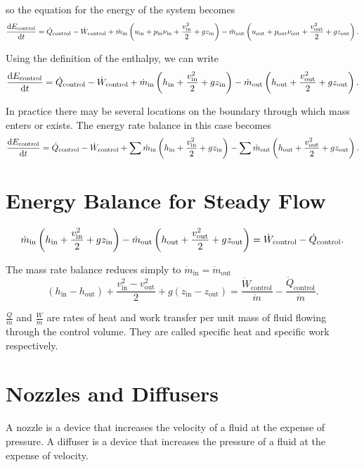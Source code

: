 \documentclass{report}
\begin{document}
so the equation for the energy of the system becomes
\[
	\dv{E_\text{control}}{t} = \dot{Q}_\text{control} - \dot{W}_\text{control} + \dot{m}_\text{in}\lt(u_\text{in} + p_\text{in}\nu_\text{in} + \frac{v_\text{in}^2}{2} + gz_\text{in}\rt) - \dot{m}_\text{out}\lt(u_\text{out} + p_\text{out}\nu_\text{out} + \frac{v_\text{out}^2}{2} + gz_\text{out}\rt)
	.\]

Using the definition of the enthalpy, we can write
\[
	\dv{E_\text{control}}{t} = \dot{Q}_\text{control} - \dot{W}_\text{control} + \dot{m}_\text{in}\lt(h_\text{in} + \frac{v_\text{in}^2}{2} + gz_\text{in}\rt) - \dot{m}_\text{out}\lt(h_\text{out} + \frac{v_\text{out}^2}{2} + gz_\text{out}\rt)
	.\]

In practice there may be several locations on the boundary through which mass enters or exists. The energy rate balance in this case becomes
\[
	\dv{E_\text{control}}{t} = \dot{Q}_\text{control} - \dot{W}_\text{control} + \sum \dot{m}_\text{in}\lt(h_\text{in} + \frac{v_\text{in}^2}{2} + gz_\text{in}\rt) - \sum \dot{m}_\text{out}\lt(h_\text{out} + \frac{v_\text{out}^2}{2} + gz_\text{out}\rt)
	.\]

\section{Energy Balance for Steady Flow}

\[
	\dot{m}_\text{in}\left(h_\text{in} + \frac{v_\text{in}^2}{2} + gz_\text{in}\right) - \dot{m}_\text{out}\left(h_\text{out} + \frac{v_\text{out}^2}{2} + gz_\text{out}\right) = \dot{W}_\text{control} - \dot{Q}_\text{control}
	.\]

The mass rate balance reduces simply to $\dot{m}_\text{in} = \dot{m}_\text{out}$
\[
	(h_\text{in} - h_\text{out}) + \frac{v_\text{in}^2 - v_\text{out}^2}{2} + g(z_\text{in} - z_\text{out}) = \frac{\dot{W}_\text{control}}{\dot{m}} - \frac{\dot{Q}_\text{control}}{\dot{m}}
	.\]

$\frac{Q}{\dot{m}}$ and $\frac{W}{\dot{m}}$ are rates of heat and work transfer per unit mass of fluid flowing through the control volume. They are called specific heat and specific work respectively.

\section{Nozzles and Diffusers}

A nozzle is a device that increases the velocity of a fluid at the expense of pressure. A diffuser is a device that increases the pressure of a fluid at the expense of velocity. \\
\end{document}

